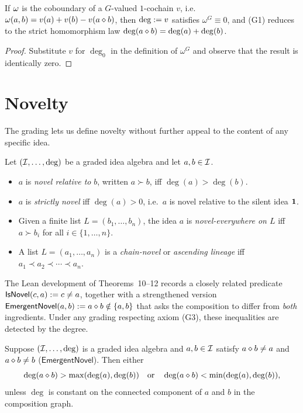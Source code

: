 \begin{corollary}
\label{cor:trivial-grading}
If $\omega$ is the coboundary of a $G$-valued $1$-cochain $v$, i.e.\
$\omega(a,b) = v(a) + v(b) - v(a\mathbin{\diamond} b)$, then $\deg \mathrel{:=} v$
satisfies $\omega^G \equiv 0$, and (G1) reduces to the strict
homomorphism law $\deg(a\mathbin{\diamond} b) = \deg(a) + \deg(b)$.
\end{corollary}

\begin{proof}
Substitute $v$ for $\deg_0$ in the definition of $\omega^G$ and observe
that the result is identically zero.
\end{proof}

\section{Novelty}\label{sec:novelty}

The grading lets us define novelty without further appeal to the
content of any specific idea.

\begin{definition}\label{def:novelty}
Let $(\mathcal{I},\dots,\deg)$ be a graded idea algebra and let $a,b\in
\mathcal{I}$.
\begin{itemize}
\item $a$ is \emph{novel relative to} $b$, written $a \succ b$, iff
  $\deg(a) > \deg(b)$.
\item $a$ is \emph{strictly novel} iff $\deg(a) > 0$, i.e.\ $a$
  is novel relative to the silent idea $\mathbf{1}$.
\item Given a finite list $L = (b_1,\dots,b_n)$, the idea $a$ is
  \emph{novel-everywhere on $L$} iff $a \succ b_i$ for all
  $i\in\{1,\dots,n\}$.
\item A list $L = (a_1,\dots,a_n)$ is a \emph{chain-novel} or
  \emph{ascending lineage} iff $a_1 \prec a_2 \prec \cdots \prec a_n$.
\end{itemize}
\end{definition}

The Lean development of Theorems~10--12 records a closely related
predicate $\mathsf{IsNovel}(c,a) \mathrel{:=} c \neq a$, together with a
strengthened version $\mathsf{EmergentNovel}(a,b) \mathrel{:=} a\mathbin{\diamond} b
\notin \{a,b\}$ that asks the composition to differ from \emph{both}
ingredients. Under any grading respecting axiom (G3), these inequalities
are detected by the degree.

\begin{lemma}
\label{lem:emergent-implies-degree}
Suppose $(\mathcal{I},\dots,\deg)$ is a graded idea algebra and $a,b\in
\mathcal{I}$ satisfy $a\mathbin{\diamond} b \neq a$ and $a\mathbin{\diamond} b \neq b$
($\mathsf{EmergentNovel}$). Then either
\[
  \deg(a\mathbin{\diamond} b) > \max(\deg(a),\deg(b))
  \quad\text{or}\quad
  \deg(a\mathbin{\diamond} b) < \min(\deg(a),\deg(b)),
\]
unless $\deg$ is constant on the connected component of $a$ and $b$ in
the composition graph.
\end{lemma}

